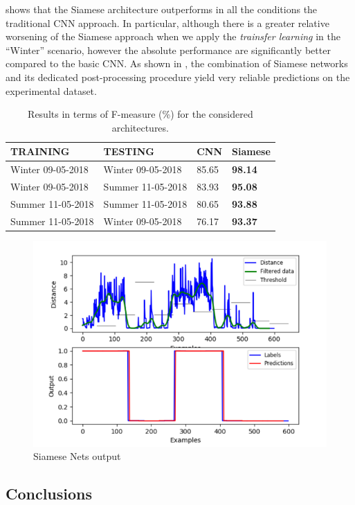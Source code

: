  shows that the Siamese architecture outperforms in all the conditions the traditional CNN approach. In particular, although there is a greater relative worsening of the Siamese approach when we apply the \textit{trainsfer learning} in the ``Winter'' scenario, however the absolute performance are significantly better compared to the basic CNN. As shown in , the combination of Siamese networks and its dedicated post-processing procedure yield very reliable predictions on the experimental dataset.


\begin{table}[h]
	\centering
	\begin{tabular}{@{}ll|ll@{}}
		\toprule
		TRAINING          & TESTING           & CNN   & Siamese        \\ \midrule
		Winter 09-05-2018 & Winter 09-05-2018 & 85.65 & \textbf{98.14} \\
		Winter 09-05-2018 & Summer 11-05-2018 & 83.93 & \textbf{95.08} \\ \midrule
		Summer 11-05-2018 & Summer 11-05-2018 & 80.65 & \textbf{93.88} \\
		Summer 11-05-2018 & Winter 09-05-2018 & 76.17 & \textbf{93.37} \\ \bottomrule
	\end{tabular}
	\caption[Acoustic road roughness classification - Results]{Results in terms of F-measure (\%) for the considered architectures.}
	\label{tab:road_results}
\end{table}



\begin{figure}
	\centering
	\includegraphics[width=0.7\columnwidth]{img/siamese_output}
	\caption{Siamese Nets output}
	\label{fig:siamese_output}
\end{figure}

\subsection{Conclusions} 

